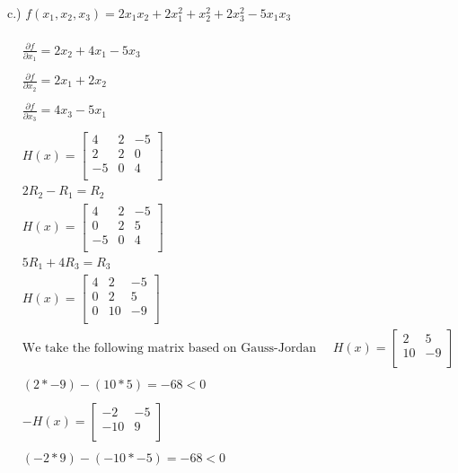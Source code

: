 \documentclass[12pt]{article}
\begin{document}
c.) $f(x_1,x_2,x_3) = 2x_1x_2 + 2x_1^2 + x_2^2 + 2x_3^2 -5x_1x_3$\\\\
\begin{align*}
    &\frac{\partial f}{\partial x_1} = 2x_2 + 4x_1 - 5x_3\\ \\
    &\frac{\partial f}{\partial x_2} = 2x_1 + 2x_2 \\ \\ 
    &\frac{\partial f}{\partial x_3} = 4x_3 - 5x_1 \\ \\
    &H(x) = 
        \begin{bmatrix}
            4 & 2 & -5 \\
            2 & 2 & 0 \\
            -5 & 0 & 4 \\
        \end{bmatrix}\\
    & 2R_2 - R_1 = R_2 \\   
    &H(x) = 
        \begin{bmatrix}
            4 & 2 & -5 \\
            0 & 2 & 5 \\
            -5 & 0 & 4 \\
        \end{bmatrix}\\
    &5R_1 + 4R_3 = R_3 \\
    &H(x) = 
        \begin{bmatrix}
            4 & 2 & -5 \\
            0 & 2 & 5 \\
            0 & 10 & -9 \\
        \end{bmatrix}\\
    &\text{We take the following matrix based on Gauss-Jordan method:} 
    &H(x) =
        \begin{bmatrix}
            2 & 5 \\
            10 & -9 \\
        \end{bmatrix}\\ \\
    &(2 * -9) -(10 *5) = -68 < 0\\ \\
        &-H(x) =
        \begin{bmatrix}
            -2 & -5 \\
            -10 & 9 \\
        \end{bmatrix}\\ \\
    &(-2 * 9) -(-10 *-5) = -68 < 0\\
\end{align*}\\
\end{document}
